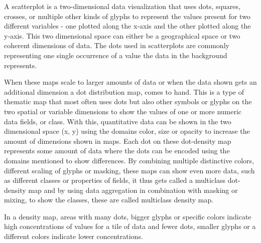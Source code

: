 

\maketitle


A scatterplot is a two-dimensional data visualization that uses dots, squares, crosses, or multiple other kinds of glyphs to represent the values present for two different variables - one plotted along the x-axis and the other plotted along the y-axis. This two dimensional space can either be a geographical space or two coherent dimensions of data. The dots used in scatterplots are commonly representing one single occurrence of a value the data in the background represents.

When these maps scale to larger amounts of data or when the data shown gets an additional dimension a dot distribution map, comes to hand. This is a type of thematic map that most often uses dots but also other symbols or glyphs on the two spatial or variable dimensions to show the values of one or more numeric data fields, or class. With this, quantitative data can be shown in the two dimensional space (x, y) using the domains color, size or opacity to increase the amount of dimensions shown in maps.
Each dot on these dot-density map represents some amount of data where the dots can be encoded using the domains mentioned to show differences. By combining multiple distinctive colors, different scaling of glyphs or masking, these maps can show even more data, such as different classes or properties of fields, it thus gets called a multiclass dot-density map and by using data aggregation in combination with masking or mixing, to show the classes, these are called multiclass density map.

In a density map, areas with many dots, bigger glyphs or specific colors indicate high concentrations of values for a tile of data and fewer dots, smaller glyphs or a different colors indicate lower concentrations.

